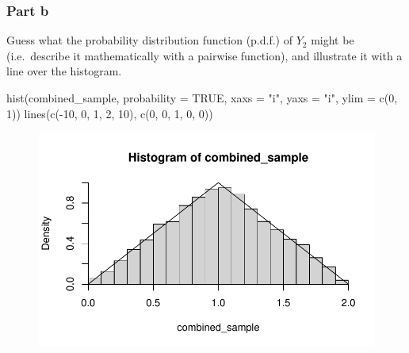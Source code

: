 \documentclass[
  letterpaper,
  DIV=11,
  numbers=noendperiod]{scrartcl}
\newenvironment{Shaded}{\begin{snugshade}}{\end{snugshade}}
\newcommand{\AttributeTok}[1]{\textcolor[rgb]{0.40,0.45,0.13}{#1}}
\newcommand{\ConstantTok}[1]{\textcolor[rgb]{0.56,0.35,0.01}{#1}}
\newcommand{\DecValTok}[1]{\textcolor[rgb]{0.68,0.00,0.00}{#1}}
\newcommand{\FunctionTok}[1]{\textcolor[rgb]{0.28,0.35,0.67}{#1}}
\newcommand{\NormalTok}[1]{\textcolor[rgb]{0.00,0.23,0.31}{#1}}
\newcommand{\SpecialCharTok}[1]{\textcolor[rgb]{0.37,0.37,0.37}{#1}}
\newcommand{\StringTok}[1]{\textcolor[rgb]{0.13,0.47,0.30}{#1}}
\begin{document}
\hypertarget{part-b-2}{%
\subsubsection{Part b}\label{part-b-2}}

Guess what the probability distribution function (p.d.f.) of \(Y_{2}\)
might be (i.e.~describe it mathematically with a pairwise function), and
illustrate it with a line over the histogram.

\begin{Shaded}
\begin{Highlighting}[]
\FunctionTok{hist}\NormalTok{(combined\_sample, }\AttributeTok{probability =} \ConstantTok{TRUE}\NormalTok{, }\AttributeTok{xaxs =} \StringTok{"i"}\NormalTok{, }\AttributeTok{yaxs =} \StringTok{"i"}\NormalTok{, }\AttributeTok{ylim =} \FunctionTok{c}\NormalTok{(}\DecValTok{0}\NormalTok{, }\DecValTok{1}\NormalTok{))}
\FunctionTok{lines}\NormalTok{(}\FunctionTok{c}\NormalTok{(}\SpecialCharTok{{-}}\DecValTok{10}\NormalTok{, }\DecValTok{0}\NormalTok{, }\DecValTok{1}\NormalTok{, }\DecValTok{2}\NormalTok{, }\DecValTok{10}\NormalTok{), }\FunctionTok{c}\NormalTok{(}\DecValTok{0}\NormalTok{, }\DecValTok{0}\NormalTok{, }\DecValTok{1}\NormalTok{, }\DecValTok{0}\NormalTok{, }\DecValTok{0}\NormalTok{))}
\end{Highlighting}
\end{Shaded}

\begin{figure}[H]

{\centering \includegraphics{HW04_Gaughan_Melissa_files/figure-pdf/3b-1.pdf}

}

\end{figure}
\end{document}
